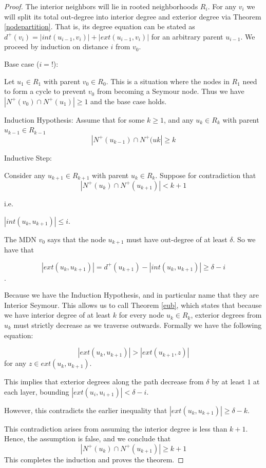 \documentclass[AMS, Times1COL]{article} %
\theoremstyle{definition}
\begin{document}
	\begin{proof}
		The interior neighbors will lie in rooted neighborhoods $R_i$. 
		For any $v_i$ we will split its total out-degree into interior degree and exterior degree via Theorem \ref{nodepartition}. That is, its degree equation can be stated as $d^+(v_i) = |int(u_{i-1}, v_i)| + |ext(u_{i-1}, v_i)|$ for an arbitrary parent $u_{i-1}$. We proceed by induction on distance $i$ from $v_0$. 
		
		Base case ($i = !$): 
		
		Let $u_1 \in R_1$ with parent $v_0 \in R_0$. This is a situation where the nodes in $R_1$ need to form a cycle to prevent $v_0$ from becoming a Seymour node. Thus we have $|N^+(v_0) \cap N^+(u_1)| \geq 1$ and the base case holds. 
		
		Induction Hypothesis: Assume that for some $k \ge 1$, and any $u_k \in R_k$ with parent $u_{k-1} \in R_{k-1}$
		$$|N^+(u_{k-1}) \cap N^+(uk| \geq k$$
		
		Inductive Step: 
		
		Consider any $u_{k+1} \in R_{k+1}$ with parent $u_k \in R_k$. Suppose for contradiction that 
		$$|N^+(u_k) \cap N^+(u_{k+1})| < k+1$$
		
		i.e. 
		
		$|int(u_k, u_{k+1})| \leq i$. 
		
		The MDN $v_0$ says that the node $u_{k+1}$ must have out-degree of at least $\delta$. So we have that 
		
		$$|ext(u_k, u_{k+1})| = d^+(u_{k+1}) - |int(u_k, u_{k+1})| \geq \delta - i$$. 
		
		Because we have the Induction Hypothesis, and in particular name that they are Interior Seymour. This allows us to call Theorem \ref{eub}, which states that because we have interior degree of at least $k$ for every node $u_k \in R_k$, exterior degrees from $u_k$ must strictly decrease as we traverse outwards. Formally we have the following equation: 
		
		$$|ext(u_k, u_{k+1})| > |ext(u_{k+1}, z)|$$ for any $z \in ext(u_k, u_{k+1})$. 
		
		This implies that exterior degrees along the path decrease from $\delta$ by at least $1$ at each layer, bounding $|ext(u_i, u_{i+1})| < \delta - i$. 
		
		However, this contradicts the earlier inequality that $|ext(u_k, u_{k+1})| \ge \delta - k$. 
		
		This contradiction arises from assuming the interior degree is less than $k+1$. Hence, the assumption is false, and we conclude that 
		$$|N^+(u_k) \cap N^+(u_{k+1})| \ge k+1$$
		This completes the induction and proves the theorem. 
		
	\end{proof}
	
\end{document}
